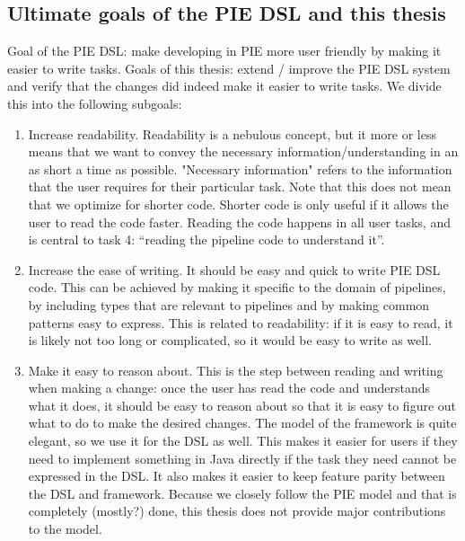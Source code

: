\subsection{Ultimate goals of the PIE DSL and this thesis}
Goal of the PIE DSL: make developing in PIE more user friendly by making it easier to write tasks.
Goals of this thesis: extend / improve the PIE DSL system and verify that the changes did indeed make it easier to write tasks.
We divide this into the following subgoals:
\begin{enumerate}
  \item Increase readability.
  Readability is a nebulous concept, but it more or less means that we want to convey the necessary information/understanding in an as short a time as possible.
  "Necessary information" refers to the information that the user requires for their particular task.
  Note that this does not mean that we optimize for shorter code.
  Shorter code is only useful if it allows the user to read the code faster.
  Reading the code happens in all user tasks, and is central to task 4: ``reading the pipeline code to understand it''.
  \item Increase the ease of writing.
  It should be easy and quick to write PIE DSL code.
  This can be achieved by making it specific to the domain of pipelines, by including types that are relevant to pipelines and by making common patterns easy to express.
  This is related to readability: if it is easy to read, it is likely not too long or complicated, so it would be easy to write as well.
  \item Make it easy to reason about.
  This is the step between reading and writing when making a change: once the user has read the code and understands what it does, it should be easy to reason about so that it is easy to figure out what to do to make the desired changes.
  The model of the framework is quite elegant, so we use it for the DSL as well.
  This makes it easier for users if they need to implement something in Java directly if the task they need cannot be expressed in the DSL.
  It also makes it easier to keep feature parity between the DSL and framework.
  Because we closely follow the PIE model and that is completely (mostly?) done, this thesis does not provide major contributions to the model.
\end{enumerate}


